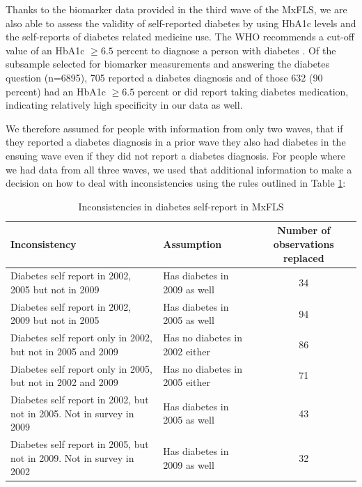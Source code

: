 \documentclass[12pt,english,british]{article}
\providecommand{\tabularnewline}{\\}
\begin{document}
Thanks to the biomarker data provided in the third wave of the \ac{MxFLS},
we are also able to assess the validity of self-reported diabetes
by using \ac{HbA1c} levels and the self-reports of diabetes
related medicine use. The \ac{WHO}
recommends a cut-off value of an \ac{HbA1c} $\geq6.5$ percent
to diagnose a person with diabetes \citep{WorldHealthOrganization2011}.
Of the subsample selected for biomarker measurements and answering
the diabetes question (n=6895), 705 reported a diabetes diagnosis
and of those 632 (90 percent) had an \ac{HbA1c} $\geq6.5$ percent
or did report taking diabetes medication, indicating relatively high specificity in our data as well.

We therefore assumed for people with information from only two waves, that if
they reported a diabetes diagnosis in a prior wave they also had diabetes
in the ensuing wave even if they did not report a diabetes diagnosis.
For people where we had data from all three waves, we used that
additional information to make a decision on how to deal with inconsistencies
using the rules outlined in Table \ref{tab:Inconsistencies}:

\begin{table}[h!]
\caption{\label{tab:Inconsistencies}Inconsistencies in diabetes self-report in MxFLS}
\begin{center}
\begin{adjustbox}{max width=\textwidth}
\begin{tabular}{llc}
\hline 
Inconsistency  & Assumption  & Number of observations replaced\tabularnewline
\hline 
Diabetes self report in 2002, 2005 but not in 2009  & Has diabetes in 2009 as well  & 34\tabularnewline
Diabetes self report in 2002, 2009 but not in 2005  & Has diabetes in 2005 as well  & 94\tabularnewline
Diabetes self report only in 2002, but not in 2005 and 2009  & Has no diabetes in 2002 either  & 86\tabularnewline
Diabetes self report only in 2005, but not in 2002 and 2009  & Has no diabetes in 2005 either  & 71\tabularnewline
Diabetes self report in 2002, but not in 2005. Not in survey in 2009  & Has diabetes in 2005 as well  & 43\tabularnewline
Diabetes self report in 2005, but not in 2009. Not in survey in 2002  & Has diabetes in 2009 as well  & 32\tabularnewline
\end{tabular}
\end{adjustbox}
\end{center}
\end{table}
\end{document}
